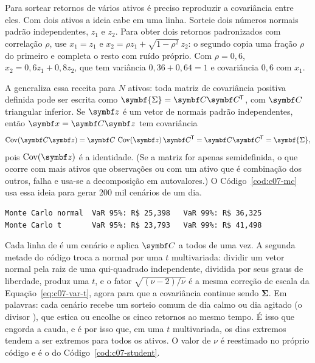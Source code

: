 Para sortear retornos de vários ativos é preciso reproduzir a covariância entre eles. Com dois ativos a ideia cabe em uma linha. Sorteie dois números normais padrão independentes, $z_1$ e $z_2$. Para obter dois retornos padronizados com correlação $\rho$, use $x_1 = z_1$ e $x_2 = \rho z_1 + \sqrt{1-\rho^2}\, z_2$: o segundo copia uma fração $\rho$ do primeiro e completa o resto com ruído próprio. Com $\rho = 0,6$, $x_2 = 0,6 z_1 + 0,8 z_2$, que tem variância $0,36 + 0,64 = 1$ e covariância $0,6$ com $x_1$.

A  generaliza essa receita para $N$ ativos: toda matriz de covariância positiva definida pode ser escrita como $\symbf{\Sigma} = \vetor{C}\vetor{C}\T$, com $\vetor{C}$ triangular inferior. Se $\vetor{z}$ é um vetor de normais padrão independentes, então $\vetor{x} = \vetor{C}\vetor{z}$ tem covariância
\begin{equation}
  \Cov(\vetor{C}\vetor{z}) = \vetor{C}\,\Cov(\vetor{z})\,\vetor{C}\T = \vetor{C}\vetor{C}\T = \symbf{\Sigma} ,
\end{equation}
pois $\Cov(\vetor{z})$ é a identidade. (Se a matriz for apenas semidefinida, o que ocorre com mais ativos que observações ou com um ativo que é combinação dos outros,  falha e usa-se a decomposição em autovalores.) O Código~\ref{cod:c07-mc} usa essa ideia para gerar 200 mil cenários de um dia.


\begin{lstlisting}[style=saida]
Monte Carlo normal  VaR 95%: R$ 25,398   VaR 99%: R$ 36,325
Monte Carlo t       VaR 95%: R$ 23,793   VaR 99%: R$ 41,498
\end{lstlisting}

Cada linha de  é um cenário e  aplica $\vetor{C}$ a todos de uma vez. A segunda metade do código troca a normal por uma $t$ multivariada: dividir um vetor normal pela raiz de uma qui-quadrado independente, dividida por seus graus de liberdade, produz uma $t$, e o fator $\sqrt{(\nu-2)/\nu}$ é a mesma correção de escala da Equação~\eqref{eq:c07-var-t}, agora para que a covariância continue sendo $\symbf{\Sigma}$. Em palavras: cada cenário recebe um sorteio comum de dia calmo ou dia agitado (o divisor ), que estica ou encolhe os cinco retornos ao mesmo tempo. É isso que engorda a cauda, e é por isso que, em uma $t$ multivariada, os dias extremos tendem a ser extremos para todos os ativos. O valor de $\nu$ é reestimado no próprio código e é o do Código~\ref{cod:c07-student}.

